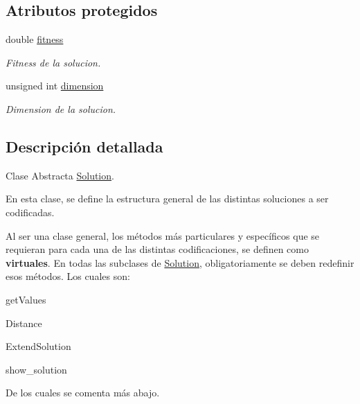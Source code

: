 \subsection*{Atributos protegidos}
\begin{DoxyCompactItemize}
\item 
\hypertarget{class_solution_a215acc6c80b2c16071246b9ded8f32ab}{double \hyperlink{class_solution_a215acc6c80b2c16071246b9ded8f32ab}{fitness}}\label{class_solution_a215acc6c80b2c16071246b9ded8f32ab}

\begin{DoxyCompactList}\small\item\em Fitness de la solucion. \end{DoxyCompactList}\item 
\hypertarget{class_solution_a7111f2ad10bd9e1696d3e19c1b5bff09}{unsigned int \hyperlink{class_solution_a7111f2ad10bd9e1696d3e19c1b5bff09}{dimension}}\label{class_solution_a7111f2ad10bd9e1696d3e19c1b5bff09}

\begin{DoxyCompactList}\small\item\em Dimension de la solucion. \end{DoxyCompactList}\end{DoxyCompactItemize}


\subsection{Descripción detallada}
Clase Abstracta \hyperlink{class_solution}{Solution}. 

En esta clase, se define la estructura general de las distintas soluciones a ser codificadas.

Al ser una clase general, los métodos más particulares y específicos que se requieran para cada una de las distintas codificaciones, se definen como {\bfseries virtuales}. En todas las subclases de \hyperlink{class_solution}{Solution}, obligatoriamente se deben redefinir esos métodos. Los cuales son\+:


\begin{DoxyItemize}
\item get\+Values 
\item Distance 
\item Extend\+Solution 
\item show\+\_\+solution 
\end{DoxyItemize}

De los cuales se comenta más abajo. 

